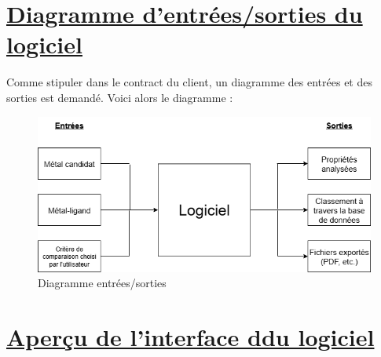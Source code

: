 \documentclass[11pt]{article}
\begin{document}
\section{\underline{Diagramme d'entrées/sorties du logiciel}}
Comme stipuler dans le contract du client, un diagramme des entrées et des sorties est demandé. Voici alors le diagramme :

\begin{figure}[h!]
  \includegraphics[width=\linewidth]{diagramme.png}
  \caption{Diagramme entrées/sorties}
\end{figure}


\section{\underline{Aperçu de l'interface ddu logiciel}}
\end{document}
